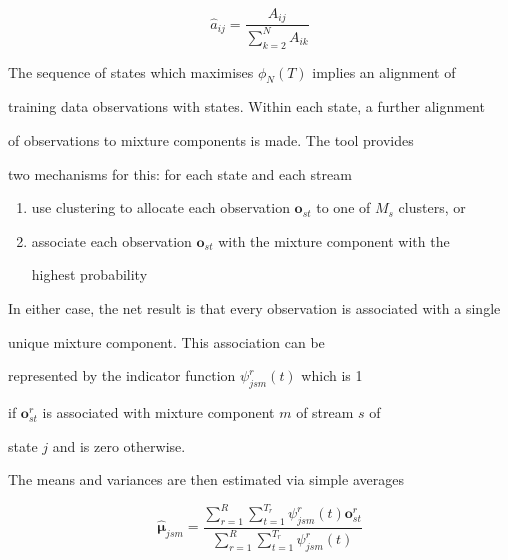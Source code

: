 \[


  \hat{a}_{ij} = \frac{A_{ij}}{\sum_{k=2}^{N}A_{ik}}


\]





The sequence of states which maximises $\phi_N(T)$ implies an alignment of


training data observations with states.  Within each state, a further alignment


of observations to mixture components is made.  The tool  provides


two mechanisms for this:  for each state and each stream


\begin{enumerate}


\item use clustering to allocate each observation $\bm{o}_{st}$ to one of $M_s$ clusters, or


\item associate each observation $\bm{o}_{st}$ with the mixture component with the


       highest probability


\end{enumerate}


In either case, the net result is that every observation is associated with a single


unique mixture component.  This association can be


represented by the indicator function $\psi^r_{jsm}(t)$ which is 1


if $\bm{o}^r_{st}$ is associated with mixture component $m$ of stream $s$ of 


state $j$ and is zero otherwise.





The means and variances are then estimated via simple averages


\newcommand{\vitsum}[2]{


                  \sum_{r=1}^R  \sum_{t=1}^{T_r} #1 \psi^r_{js#2}(t)


}





\[


   \hat{\bm{\mu}}_{jsm} = \frac{


                \vitsum{}{m}\bm{o}^r_{st}}{\vitsum{}{m}}


\]





